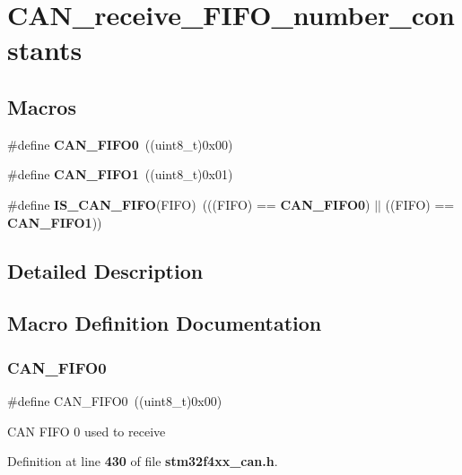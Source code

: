 \section{C\+A\+N\+\_\+receive\+\_\+\+F\+I\+F\+O\+\_\+number\+\_\+constants}
\label{group__CAN__receive__FIFO__number__constants}
\subsection*{Macros}
\begin{DoxyCompactItemize}
\item 
\#define \textbf{ C\+A\+N\+\_\+\+F\+I\+F\+O0}~((uint8\+\_\+t)0x00)
\item 
\#define \textbf{ C\+A\+N\+\_\+\+F\+I\+F\+O1}~((uint8\+\_\+t)0x01)
\item 
\#define \textbf{ I\+S\+\_\+\+C\+A\+N\+\_\+\+F\+I\+FO}(F\+I\+FO)~(((F\+I\+FO) == \textbf{ C\+A\+N\+\_\+\+F\+I\+F\+O0}) $\vert$$\vert$ ((F\+I\+FO) == \textbf{ C\+A\+N\+\_\+\+F\+I\+F\+O1}))
\end{DoxyCompactItemize}


\subsection{Detailed Description}


\subsection{Macro Definition Documentation}
\mbox{\label{group__CAN__receive__FIFO__number__constants_ga8f52eeefb86b2af5b7c3b4b75fa4d114}} 
\subsubsection{C\+A\+N\+\_\+\+F\+I\+F\+O0}
{\footnotesize\ttfamily \#define C\+A\+N\+\_\+\+F\+I\+F\+O0~((uint8\+\_\+t)0x00)}

C\+AN F\+I\+FO 0 used to receive 

Definition at line \textbf{ 430} of file \textbf{ stm32f4xx\+\_\+can.\+h}.

